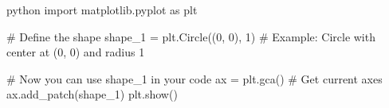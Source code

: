 python
import matplotlib.pyplot as plt

# Define the shape
shape_1 = plt.Circle((0, 0), 1)  # Example: Circle with center at (0, 0) and radius 1

# Now you can use shape_1 in your code
ax = plt.gca()  # Get current axes
ax.add_patch(shape_1)
plt.show()